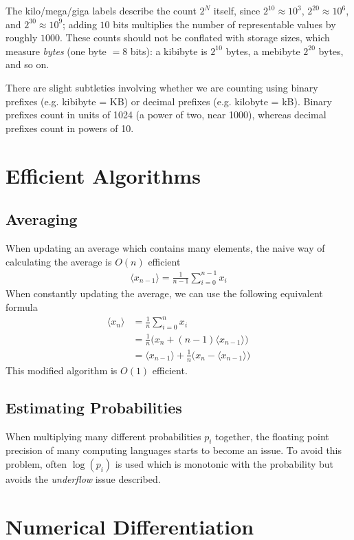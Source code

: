 The kilo/mega/giga labels describe the count $2^N$ itself, since $2^{10}\approx10^3$, $2^{20}\approx10^6$, and $2^{30}\approx10^9$; adding $10$ bits multiplies the number of representable values by roughly $1000$. These counts should not be conflated with storage sizes, which measure \emph{bytes} (one byte $=8$ bits): a kibibyte is $2^{10}$ bytes, a mebibyte $2^{20}$ bytes, and so on.

There are slight subtleties involving whether we are counting using binary prefixes (e.g. kibibyte = KB) or decimal prefixes (e.g. kilobyte = kB). Binary prefixes count in units of 1024 (a power of two, near 1000), whereas decimal prefixes count in powers of 10. 

\section{Efficient Algorithms}

\subsection{Averaging}
When updating an average which contains many elements, the naive way of calculating the average is $O(n)$ efficient 
\begin{align}
	\langle x_{n-1}\rangle = \frac{1}{n-1}\sum_{i=0}^{n-1} x_i
\end{align}
When constantly updating the average, we can use the following equivalent formula
\begin{align}
	\langle x_{n}\rangle &= \frac{1}{n}\sum_{i=0}^{n} x_i\\
	&= \frac{1}{n}\Big(x_n + (n-1)\langle x_{n-1}\rangle\Big)\\
	&= \langle x_{n-1}\rangle + \frac{1}{n}\Big(x_n - \langle x_{n-1} \rangle\Big)
\end{align}
This modified algorithm is $O(1)$ efficient.

\subsection{Estimating Probabilities}
When multiplying many different probabilities $p_i$ together, the floating point precision of many computing languages starts to become an issue. To avoid this problem, often $\log(p_i)$ is used which is monotonic with the probability but avoids the \textit{underflow} issue described.

\section{Numerical Differentiation}\label{numerical-diff}

